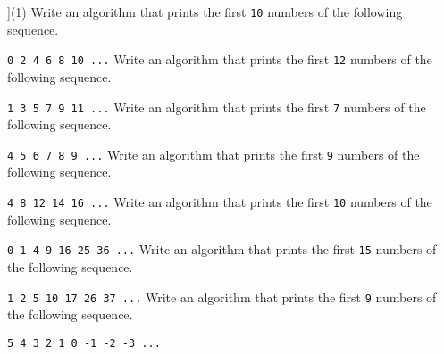 \begin{exercise}
    \begin{longtasks}[counter-format=7.tsk[1]](1)
        \task
        Write an algorithm that prints the first \texttt{10} numbers of the following sequence.
        
        \texttt{0 2 4 6 8 10 ...}
        \task
        Write an algorithm that prints the first \texttt{12} numbers of the following sequence.

        \texttt{1 3 5 7 9 11 ...}
        \task
        Write an algorithm that prints the first \texttt{7} numbers of the following sequence.

        \texttt{4 5 6 7 8 9 ...}
        \task
        Write an algorithm that prints the first \texttt{9} numbers of the following sequence.

        \texttt{4 8 12 14 16 ...}
        \task
        Write an algorithm that prints the first \texttt{10} numbers of the following sequence.

        \texttt{0 1 4 9 16 25 36 ...}
        \task
        Write an algorithm that prints the first \texttt{15} numbers of the following sequence.

        \texttt{1 2 5 10 17 26 37 ...}
        \task
        Write an algorithm that prints the first \texttt{9} numbers of the following sequence.

        \texttt{5 4 3 2 1 0 -1 -2 -3 ...}
    \end{longtasks}
\end{exercise}
